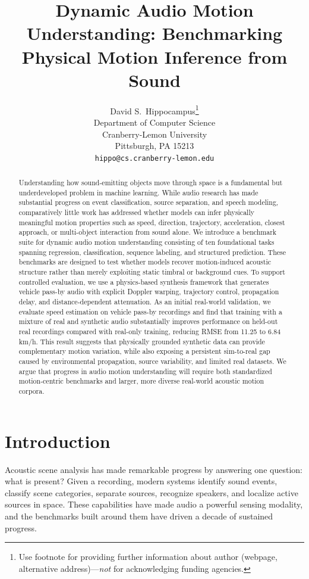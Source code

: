 \documentclass{article}
\title{Dynamic Audio Motion Understanding: Benchmarking Physical Motion Inference from Sound}
\author{%
  David S.~Hippocampus\thanks{Use footnote for providing further information
    about author (webpage, alternative address)---\emph{not} for acknowledging
    funding agencies.} \\
  Department of Computer Science\\
  Cranberry-Lemon University\\
  Pittsburgh, PA 15213 \\
  \texttt{hippo@cs.cranberry-lemon.edu} \\
}
\begin{document}
\maketitle


\begin{abstract}
Understanding how sound-emitting objects move through space is a fundamental but underdeveloped problem in machine learning. While audio research has made substantial progress on event classification, source separation, and speech modeling, comparatively little work has addressed whether models can infer physically meaningful motion properties such as speed, direction, trajectory, acceleration, closest approach, or multi-object interaction from sound alone. We introduce a benchmark suite for dynamic audio motion understanding consisting of ten foundational tasks spanning regression, classification, sequence labeling, and structured prediction. These benchmarks are designed to test whether models recover motion-induced acoustic structure rather than merely exploiting static timbral or background cues. To support controlled evaluation, we use a physics-based synthesis framework that generates vehicle pass-by audio with explicit Doppler warping, trajectory control, propagation delay, and distance-dependent attenuation. As an initial real-world validation, we evaluate speed estimation on vehicle pass-by recordings and find that training with a mixture of real and synthetic audio substantially improves performance on held-out real recordings compared with real-only training, reducing RMSE from 11.25 to 6.84 km/h. This result suggests that physically grounded synthetic data can provide complementary motion variation, while also exposing a persistent sim-to-real gap caused by environmental propagation, source variability, and limited real datasets. We argue that progress in audio motion understanding will require both standardized motion-centric benchmarks and larger, more diverse real-world acoustic motion corpora.
\end{abstract}




\section{Introduction}
\label{sec:intro}

Acoustic scene analysis has made remarkable progress by answering one question: what is present? Given a recording, modern systems identify sound events, classify scene categories, separate sources, recognize speakers, and localize active sources in space. These capabilities have made audio a powerful sensing modality, and the benchmarks built around them have driven a decade of sustained progress.
\end{document}
